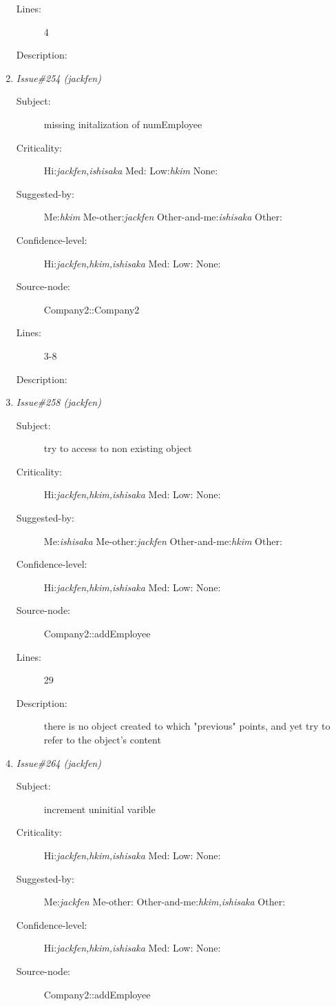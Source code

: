 \begin{enumerate}
\begin{description}
\item [Lines:] 4

\item [Description:] 
\end{description}
\item {\it Issue\#254 (jackfen)}
\begin{description}
\item [Subject:] missing initalization of numEmployee
\item [Criticality:] Hi:{\it jackfen,ishisaka} Med:{\it } Low:{\it hkim} None:{\it }
\item [Suggested-by:] Me:{\it hkim} Me-other:{\it jackfen} Other-and-me:{\it ishisaka} Other:{\it }
\item [Confidence-level:] Hi:{\it jackfen,hkim,ishisaka} Med:{\it } Low:{\it } None:{\it }
\item [Source-node:] Company2::Company2

\item [Lines:] 3-8

\item [Description:] 
\end{description}
\item {\it Issue\#258 (jackfen)}
\begin{description}
\item [Subject:] try to access to non existing object
\item [Criticality:] Hi:{\it jackfen,hkim,ishisaka} Med:{\it } Low:{\it } None:{\it }
\item [Suggested-by:] Me:{\it ishisaka} Me-other:{\it jackfen} Other-and-me:{\it hkim} Other:{\it }
\item [Confidence-level:] Hi:{\it jackfen,hkim,ishisaka} Med:{\it } Low:{\it } None:{\it }
\item [Source-node:] Company2::addEmployee

\item [Lines:] 29

\item [Description:] there is no object created to which "previous"
points, and yet try to refer to the object's content
\end{description}
\item {\it Issue\#264 (jackfen)}
\begin{description}
\item [Subject:] increment uninitial varible
\item [Criticality:] Hi:{\it jackfen,hkim,ishisaka} Med:{\it } Low:{\it } None:{\it }
\item [Suggested-by:] Me:{\it jackfen} Me-other:{\it } Other-and-me:{\it hkim,ishisaka} Other:{\it }
\item [Confidence-level:] Hi:{\it jackfen,hkim,ishisaka} Med:{\it } Low:{\it } None:{\it }
\item [Source-node:] Company2::addEmployee


\end{description}
\end{enumerate}
